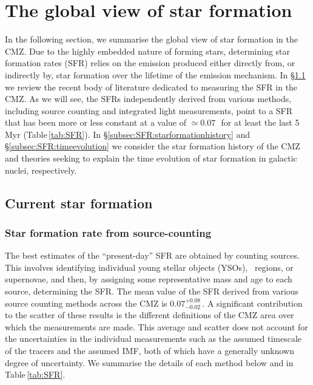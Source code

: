 \section{The global view of star formation}
\label{sec:global}

In the following section, we summarise the global view of star formation in the CMZ. 
Due to the highly embedded nature of forming stars, determining star formation rates (SFR) relies on the emission produced either directly from, or indirectly by, star formation over the lifetime of the emission mechanism.
In \S \ref{sec:SFR:current} we review the recent body of literature dedicated to measuring the SFR in the CMZ. As we will see, the SFRs independently derived from various methods, including source counting and integrated light measurements, point to a SFR that has been more or less constant at a value of $\simeq0.07$\,\msunyr \ for at least the last 5\,Myr (Table\,\ref{tab:SFR}).
In \S\ref{subsec:SFR:starformationhistory} and \S\ref{subsec:SFR:timeevolution} we consider the star formation history of the CMZ and theories seeking to explain the time evolution of star formation in galactic nuclei, respectively. 

\subsection{Current star formation} \label{sec:SFR:current}

\subsubsection{Star formation rate from source-counting}
\label{subsec:SFR:current}

The best estimates of the ``present-day'' SFR are obtained by counting sources. This involves identifying individual young stellar objects (YSOs), \hii\ regions, or supernovae, and then, by assigning some representative mass and age to each source, determining the SFR. The mean value of the SFR derived from various source counting methods across the CMZ is $0.07^{+0.08}_{-0.02}$\,\msunyr.
A significant contribution to the scatter of these results is the different definitions of the CMZ area over which the measurements are made.
This average and scatter does not account for the uncertainties in the individual measurements such as the assumed timescale of the tracers and the assumed IMF, both of which have a generally unknown degree of uncertainty. We summarise the details of each method below and in Table\,\ref{tab:SFR}.

